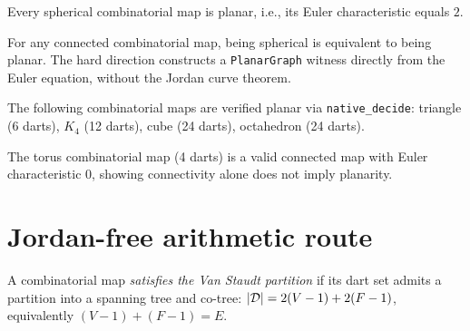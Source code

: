 \begin{theorem}\label{thm:spherical_planar}
\leanok
{}
Every spherical combinatorial map is planar, i.e., its Euler characteristic
equals $2$.
\end{theorem}

\begin{theorem}\label{thm:spherical_iff_planar}
\leanok
{}
For any connected combinatorial map, being spherical is equivalent to
being planar. The hard direction constructs a \texttt{PlanarGraph} witness
directly from the Euler equation, without the Jordan curve theorem.
\end{theorem}

\begin{example}\label{ex:concrete}
\leanok
{}
The following combinatorial maps are verified planar via \texttt{native\_decide}:
triangle (6 darts), $K_4$ (12 darts), cube (24 darts), octahedron (24 darts).
\end{example}

\begin{example}\label{ex:torus}
\leanok
{}
The torus combinatorial map (4 darts) is a valid connected map with
Euler characteristic $0$, showing connectivity alone does not imply planarity.
\end{example}

\section{Jordan-free arithmetic route}

\begin{definition}\label{def:vanstaudt}
\leanok
{}
A combinatorial map \emph{satisfies the Van Staudt partition} if its dart
set admits a partition into a spanning tree and co-tree: $|\mathcal{D}| = 2(V-1) + 2(F-1)$,
equivalently $(V-1) + (F-1) = E$.
\end{definition}

